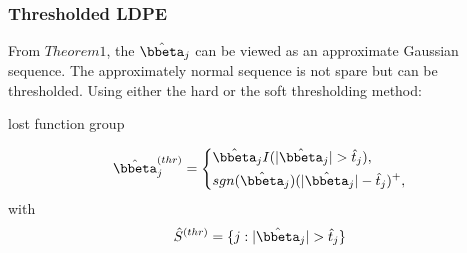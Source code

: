 \begin{frame}
    \frametitle{Thresholded LDPE}
        From $Theorem 1$, the $\hat{\bbeta}_{j}$ can be viewed as an approximate Gaussian sequence. The approximately normal sequence is not spare but can be thresholded.
        Using either the hard or the soft thresholding method:
        
        lost function group
    
    \begin{equation}\label{TLDPE}
    \hat{\bbeta}^{(thr)}_{j}=
    \left\{
            \begin{aligned}%
            & \hat{\bbeta}_{j} I(|\hat{\bbeta}_{j}|>\hat{t}_{j}),   \\
            & sgn(\hat{\bbeta}_{j})(|\hat{\bbeta}_{j}|-\hat{t}_{j})^{+}, \\
            \end{aligned}
    \right.
    \end{equation}
    with
    \begin{equation*}
    \hat{S}^{(thr)}=\{j:|\hat{\bbeta}_{j}|>\hat{t}_{j}\}
    \end{equation*}
    
    
\end{frame}


